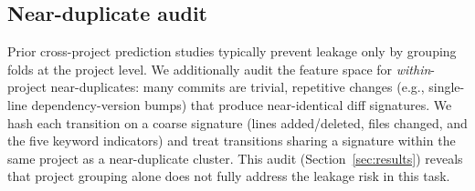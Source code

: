 \documentclass[preprint,12pt]{elsarticle}
\begin{document}
\subsection{Near-duplicate audit}
\label{sec:dupaudit}
Prior cross-project prediction studies typically prevent leakage only by grouping folds at the project level. We additionally audit the feature space for \emph{within}-project near-duplicates: many commits are trivial, repetitive changes (e.g., single-line dependency-version bumps) that produce near-identical diff signatures. We hash each transition on a coarse signature (lines added/deleted, files changed, and the five keyword indicators) and treat transitions sharing a signature within the same project as a near-duplicate cluster. This audit (Section~\ref{sec:results}) reveals that project grouping alone does not fully address the leakage risk in this task.
\end{document}

